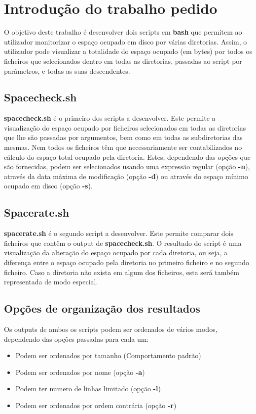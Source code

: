 \chapter{Introdução do trabalho pedido}
O objetivo deste trabalho é desenvolver dois scripts em \textbf{bash} que permitem ao utilizador monitorizar o espaço ocupado em disco por várias diretorias. Assim, o utilizador pode visualizar a totalidade do espaço ocupado (em bytes) por todos os ficheiros que selecionados dentro em todas as diretorias, passadas ao script por parâmetros, e todas as suas descendentes.
\section{Spacecheck.sh}
\textbf{spacecheck.sh} é o primeiro dos scripts a desenvolver. Este permite a visualização do espaço ocupado por ficheiros selecionados em todas as diretorias que lhe são passadas por argumentos, bem como em todas as subdiretorias das mesmas. 
Nem todos os ficheiros têm que necessariamente ser contabilizados no cálculo do espaço total ocupado pela diretoria.
Estes, dependendo das opções que são fornecidas, podem ser selecionados usando uma expressão regular (opção \textbf{-n}), através da data máxima de modificação (opção \textbf{-d}) ou através do espaço mínimo ocupado em disco (opção \textbf{-s}).
\section{Spacerate.sh}
\textbf{spacerate.sh} é o segundo script a desenvolver. Este permite comparar dois ficheiros que contêm o output de \textbf{spacecheck.sh}. O resultado do script é uma visualização da alteração do espaço ocupado por cada diretoria, ou seja, a diferença entre o espaço ocupado pela diretoria no primeiro ficheiro e no segundo ficheiro. Caso a diretoria não exista em algum dos ficheiros, esta será também representada de modo especial.
\section{Opções de organização dos resultados}
Os outputs de ambos os scripts podem ser ordenados de vários modos, dependendo das opções passadas para cada um:
\begin{itemize}
    \item Podem ser ordenados por tamanho (Comportamento padrão)
    \item Podem ser ordenados por nome (opção \textbf{-a})
    \item Podem ter numero de linhas limitado (opção \textbf{-l})
    \item Podem ser ordenados por ordem contrária (opção \textbf{-r})
\end{itemize}
\newpage
